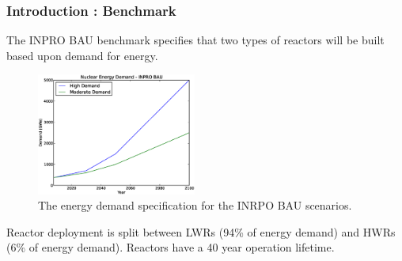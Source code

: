 \begin{frame}[ctb!]
  \frametitle{Introduction : Benchmark}
  The INPRO BAU benchmark specifies that two types of reactors will
  be built based upon demand for energy.
  \begin{figure}[htbp!]
    \begin{center}
      \includegraphics[height=4cm]{inpro-demand.eps}
    \caption{The energy demand specification for the INRPO BAU scenarios.}
    \label{fig:inpro-demand}
    \end{center}  
  \end{figure}
  Reactor deployment is split between LWRs (94\% of energy demand) and
  HWRs (6\% of energy demand). Reactors have a 40 year operation lifetime.
\end{frame}
